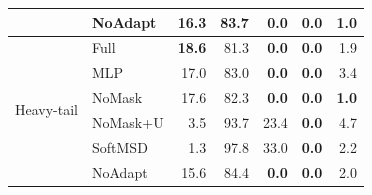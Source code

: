 \documentclass[final,5p]{elsarticle}
\begin{document}
\begin{table}[t]
{\begin{tabular}{llrrrrr}
& NoAdapt & 16.3 & 83.7 & \textbf{0.0} & \textbf{0.0} & 1.0 \\
\midrule
\multirow{6}{*}{Heavy-tail}
& Full & \textbf{18.6} & 81.3 & \textbf{0.0} & \textbf{0.0} & 1.9 \\
& MLP & 17.0 & 83.0 & \textbf{0.0} & \textbf{0.0} & 3.4 \\
& NoMask & 17.6 & 82.3 & \textbf{0.0} & \textbf{0.0} & \textbf{1.0} \\
& NoMask+U & 3.5 & 93.7 & 23.4 & \textbf{0.0} & 4.7 \\
& SoftMSD & 1.3 & 97.8 & 33.0 & \textbf{0.0} & 2.2 \\
& NoAdapt & 15.6 & 84.4 & \textbf{0.0} & \textbf{0.0} & 2.0 \\
\bottomrule
\end{tabular}
}
\end{table}
\end{document}
